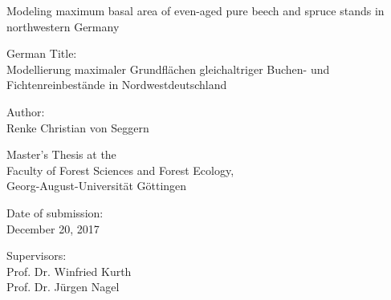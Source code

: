 \begin{titlepage}

\begin{center}

\vspace*{5cm}

{\LARGE Modeling maximum basal area of even-aged pure beech and spruce stands in northwestern Germany \\}

\vspace{1cm}

{\large German Title: \\ Modellierung maximaler Grundflächen gleichaltriger Buchen- und Fichtenreinbestände in Nordwestdeutschland \\}

\vspace{2cm}

{\large Author: \\ Renke Christian von Seggern \par}

\vspace{2cm}

{\normalsize Master’s Thesis at the \\
  Faculty of Forest Sciences and Forest Ecology, \\
  Georg-August-Universität Göttingen}

\vspace{0.5cm}

{\normalsize Date of submission: \\ December 20, 2017 \par}

\vspace{0.5cm}

{\normalsize Supervisors: \\ Prof. Dr. Winfried Kurth \\ Prof. Dr. Jürgen Nagel \par}

\end{center}

\end{titlepage}

